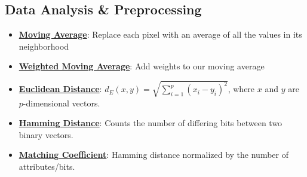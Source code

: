 \documentclass{article}%
\begin{document}
%
\subsection{Data Analysis \& Preprocessing}%
\label{subsec:DataAnalysisPreprocessing}%
\begin{itemize}[leftmargin=*]%
\item \href{https://purdue.brightspace.com/d2l/common/assets/pdfjs-d2l-dist/1.0.14-legacy/web/viewer.html?file=\%2Fcontent\%2Fenforced\%2F1095467-wl.202510.CS.24300.001\%2F07L2-Vision.pdf\%3Fou\%3D1095467\&lang=en-us\&container=d2l-fileviewer-rendered-pdf\&fullscreen=d2l-fileviewer-rendered-pdf-dialog\&height=667#page=38}{\textbf{Moving Average}}: Replace each pixel with an average of all the values in its neighborhood%
\item \href{https://purdue.brightspace.com/d2l/common/assets/pdfjs-d2l-dist/1.0.14-legacy/web/viewer.html?file=\%2Fcontent\%2Fenforced\%2F1095467-wl.202510.CS.24300.001\%2F07L2-Vision.pdf\%3Fou\%3D1095467\&lang=en-us\&container=d2l-fileviewer-rendered-pdf\&fullscreen=d2l-fileviewer-rendered-pdf-dialog\&height=667#page=40}{\textbf{Weighted Moving Average}}: Add weights to our moving average%
\item \href{https://purdue.brightspace.com/d2l/common/assets/pdfjs-d2l-dist/1.0.14-legacy/web/viewer.html?file=\%2Fcontent\%2Fenforced\%2F1095467-wl.202510.CS.24300.001\%2F12L2-distance-clusters.pdf\%3Fou\%3D1095467\&lang=en-us\&container=d2l-fileviewer-rendered-pdf\&fullscreen=d2l-fileviewer-rendered-pdf-dialog\&height=667#page=17}{\textbf{Euclidean Distance}}: $d_E(x, y) = \sqrt{\sum_{i=1}^{p} (x_i - y_i)^2}$, where $x$ and $y$ are $p$-dimensional vectors.%
\item \href{https://purdue.brightspace.com/d2l/common/assets/pdfjs-d2l-dist/1.0.14-legacy/web/viewer.html?file=\%2Fcontent\%2Fenforced\%2F1095467-wl.202510.CS.24300.001\%2F12L2-distance-clusters.pdf\%3Fou\%3D1095467\&lang=en-us\&container=d2l-fileviewer-rendered-pdf\&fullscreen=d2l-fileviewer-rendered-pdf-dialog\&height=667#page=19}{\textbf{Hamming Distance}}: Counts the number of differing bits between two binary vectors.%
\item \href{https://purdue.brightspace.com/d2l/common/assets/pdfjs-d2l-dist/1.0.14-legacy/web/viewer.html?file=\%2Fcontent\%2Fenforced\%2F1095467-wl.202510.CS.24300.001\%2F12L2-distance-clusters.pdf\%3Fou\%3D1095467\&lang=en-us\&container=d2l-fileviewer-rendered-pdf\&fullscreen=d2l-fileviewer-rendered-pdf-dialog\&height=667#page=19}{\textbf{Matching Coefficient}}: Hamming distance normalized by the number of attributes/bits.%
\end{itemize}
\end{document}
